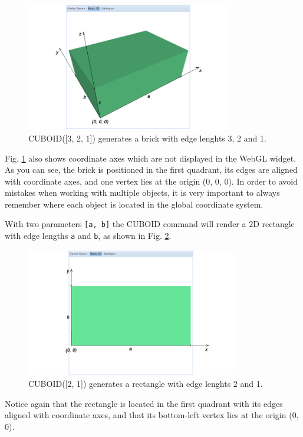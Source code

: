 \documentclass{article}
\begin{document}
\begin{figure}[!ht]
\begin{center}
\includegraphics[width=0.8\textwidth]{img/cuboid-1.png}
\end{center}
\vspace{-2mm}
\caption{CUBOID([3, 2, 1]) generates a brick with edge lenghts 3, 2 and 1.}
\label{fig:cuboid-1}
\end{figure}
\noindent
Fig. \ref{fig:cuboid-1} also shows coordinate axes which are not
displayed in the WebGL widget. As you can see, the brick is positioned 
in the first quadrant, its edges are aligned with coordinate axes, and one 
vertex lies at the origin (0, 0, 0). In order to avoid mistakes when working with 
multiple objects, it is very important to always remember where
each object is located in the global coordinate system. 

With two parameters {\tt [a, b]} the CUBOID command will render a 2D rectangle 
with edge lengths {\tt a} and {\tt b}, as shown in Fig. \ref{fig:cuboid-2}.

\newpage

\begin{figure}[!ht]
\begin{center}
\includegraphics[width=0.82\textwidth]{img/cuboid-2.png}
\end{center}
\vspace{-2mm}
\caption{CUBOID([2, 1]) generates a rectangle with edge lenghts 2 and 1.}
\label{fig:cuboid-2}
\end{figure}
\noindent
Notice again that the rectangle is located in the first quadrant with its edges 
aligned with coordinate axes, and that its bottom-left vertex lies at the 
origin (0, 0).
\end{document}
